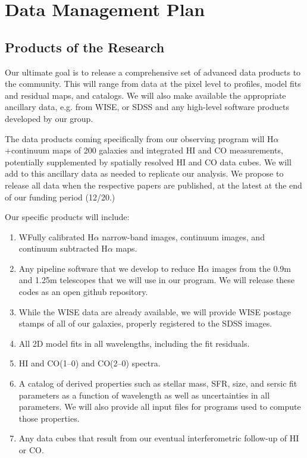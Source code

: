 \documentclass[11pt,preprint]{aastex}
\begin{document}
\section*{Data Management Plan}

\subsection*{Products of the Research}

Our ultimate goal is to release a comprehensive set of advanced data products to the community.  This will range from data at the pixel level to profiles, model fits and residual maps, and catalogs.  We will also make available the appropriate ancillary data, e.g. from WISE, or SDSS and any high-level software products developed by our group.

The data products coming specifically from our observing program will  H$\alpha$+continuum maps of 200 galaxies and integrated HI and CO measurements, potentially supplemented by spatially resolved HI and CO data cubes.  We will add to this ancillary data as needed to replicate our analysis.  We propose to release all data when the respective papers are published, at the latest at the end of our funding period (12/20.)

Our specific products will include:

\begin{enumerate}

\item WFully calibrated H$\alpha$ narrow-band images, continuum images, and continuum subtracted H$\alpha$ maps.  

\item Any pipeline software that we develop to reduce H$\alpha$ images from the 0.9m and 1.25m telescopes that we will use in our program.  We will release these codes as an open github repository.

\item While the WISE data are already available, we will provide WISE postage stamps of all of our galaxies, properly registered to the SDSS images.  

\item All 2D model fits in all wavelengths, including the fit residuals.

\item HI and CO(1--0)  and CO(2--0) spectra. 

\item A catalog of derived properties such as stellar mass, SFR, size, and sersic fit parameters as a function of wavelength as well as uncertainties in all parameters.  We will also provide all input files for programs used to compute those properties.

\item Any data cubes that result from our eventual interferometric follow-up of HI or CO.

\end{enumerate}
\end{document}
